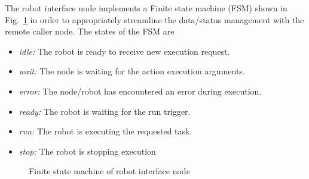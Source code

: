 The robot interface node implements a Finite state machine (FSM) shown in Fig.~\ref{fig:robot_fsm} in order to appropriately streamline the data/status management with the remote caller node. The states of the FSM are
\begin{itemize}[leftmargin={1cm},topsep={0pt},itemsep={0pt},partopsep={0pt},parsep={0pt}] 
\item \emph{idle:} The robot is ready to receive new execution request.
\item \emph{wait:} The node is waiting for the action execution arguments.
\item \emph{error:} The node/robot has encountered an error during execution.
\item \emph{ready:} The robot is waiting for the run trigger.
\item \emph{run:} The robot is executing the requested task.
\item \emph{stop:} The robot is stopping execution
\end{itemize}
\begin{figure}[H]
\centering
{}
\caption[Finite state machine of robot interface node]{Finite state machine of robot interface node}
\label{fig:robot_fsm}
\end{figure}
